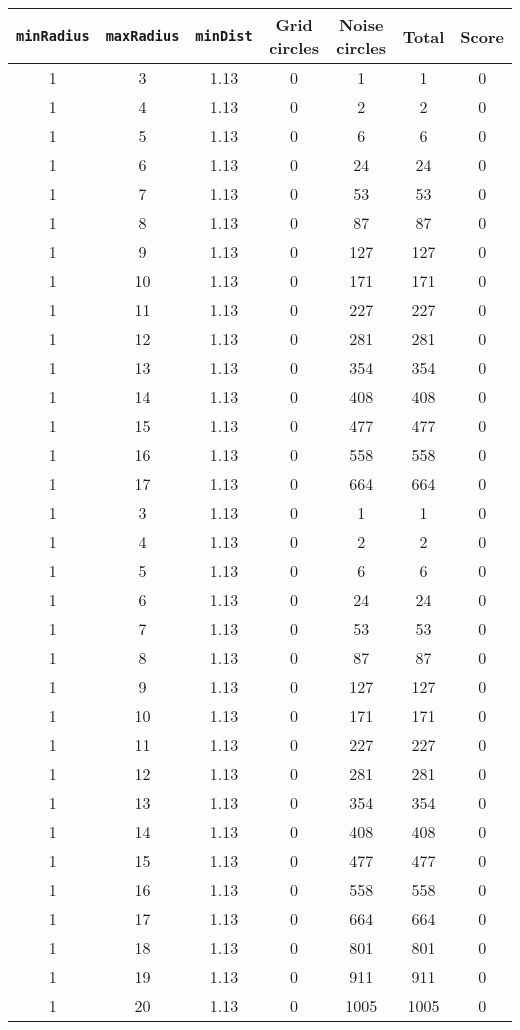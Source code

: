 \documentclass[letterpaper, 12pt]{article}
\begin{document}
\begin{longtable}{|c|c|c|c|c|c|c|}
\hline
\textbf{\texttt{minRadius}} & \textbf{\texttt{maxRadius}} & \textbf{\texttt{minDist}} & \textbf{Grid circles} & \textbf{Noise circles} & \textbf{Total} & \textbf{Score} \\
\hline
1 & 3 & 1.13 & 0 & 1 & 1 & 0 \\
\hline
1 & 4 & 1.13 & 0 & 2 & 2 & 0 \\
\hline
1 & 5 & 1.13 & 0 & 6 & 6 & 0 \\
\hline
1 & 6 & 1.13 & 0 & 24 & 24 & 0 \\
\hline
1 & 7 & 1.13 & 0 & 53 & 53 & 0 \\
\hline
1 & 8 & 1.13 & 0 & 87 & 87 & 0 \\
\hline
1 & 9 & 1.13 & 0 & 127 & 127 & 0 \\
\hline
1 & 10 & 1.13 & 0 & 171 & 171 & 0 \\
\hline
1 & 11 & 1.13 & 0 & 227 & 227 & 0 \\
\hline
1 & 12 & 1.13 & 0 & 281 & 281 & 0 \\
\hline
1 & 13 & 1.13 & 0 & 354 & 354 & 0 \\
\hline
1 & 14 & 1.13 & 0 & 408 & 408 & 0 \\
\hline
1 & 15 & 1.13 & 0 & 477 & 477 & 0 \\
\hline
1 & 16 & 1.13 & 0 & 558 & 558 & 0 \\
\hline
1 & 17 & 1.13 & 0 & 664 & 664 & 0 \\
\hline
1 & 3 & 1.13 & 0 & 1 & 1 & 0 \\
\hline
1 & 4 & 1.13 & 0 & 2 & 2 & 0 \\
\hline
1 & 5 & 1.13 & 0 & 6 & 6 & 0 \\
\hline
1 & 6 & 1.13 & 0 & 24 & 24 & 0 \\
\hline
1 & 7 & 1.13 & 0 & 53 & 53 & 0 \\
\hline
1 & 8 & 1.13 & 0 & 87 & 87 & 0 \\
\hline
1 & 9 & 1.13 & 0 & 127 & 127 & 0 \\
\hline
1 & 10 & 1.13 & 0 & 171 & 171 & 0 \\
\hline
1 & 11 & 1.13 & 0 & 227 & 227 & 0 \\
\hline
1 & 12 & 1.13 & 0 & 281 & 281 & 0 \\
\hline
1 & 13 & 1.13 & 0 & 354 & 354 & 0 \\
\hline
1 & 14 & 1.13 & 0 & 408 & 408 & 0 \\
\hline
1 & 15 & 1.13 & 0 & 477 & 477 & 0 \\
\hline
1 & 16 & 1.13 & 0 & 558 & 558 & 0 \\
\hline
1 & 17 & 1.13 & 0 & 664 & 664 & 0 \\
\hline
1 & 18 & 1.13 & 0 & 801 & 801 & 0 \\
\hline
1 & 19 & 1.13 & 0 & 911 & 911 & 0 \\
\hline
1 & 20 & 1.13 & 0 & 1005 & 1005 & 0 \\
\hline
\end{longtable}
\end{document}
